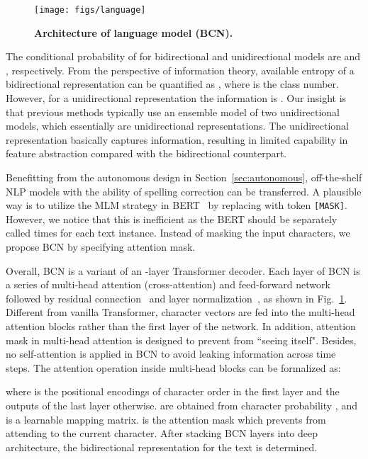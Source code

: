 \documentclass[10pt,journal,compsoc]{IEEEtran}
\begin{document}
\begin{figure}
   \begin{center}
      \texttt{[image: figs/language]}
      \caption{\textbf{Architecture of language model (BCN).}}
      \label{fig:label}
   \end{center}
   \vspace{-2em}   
\end{figure}

The conditional probability of  for bidirectional and unidirectional models are  and , respectively. From the perspective of information theory, available entropy of a bidirectional representation can be quantified as , where  is the class number. However, for a unidirectional representation the information is . Our insight is that previous methods typically use an ensemble model of two unidirectional models, which essentially are unidirectional representations. The unidirectional representation basically captures  information, resulting in limited capability in feature abstraction compared with the bidirectional counterpart.


Benefitting from the autonomous design in Section~\ref{sec:autonomous}, off-the-shelf NLP models with the ability of spelling correction can be transferred. A plausible way is to utilize the MLM strategy in BERT~\cite{devlin2018bert} by replacing  with token {\tt{[MASK]}}. However, we notice that this is inefficient as the BERT should be separately called  times for each text instance. Instead of masking the input characters, we propose BCN by specifying attention mask.


Overall, BCN is a variant of an -layer Transformer decoder. Each layer of BCN is a series of multi-head attention (cross-attention) and feed-forward network~\cite{vaswani2017attention} followed by residual connection~\cite{he2016deep} and layer normalization~\cite{ba2016layer}, as shown in Fig.~\ref{fig:label}. Different from vanilla Transformer, character vectors are fed into the multi-head attention blocks rather than the first layer of the network. In addition, attention mask in multi-head attention is designed to prevent from “seeing itself". Besides, no self-attention is applied in BCN to avoid leaking information across time steps. The attention operation inside multi-head blocks can be formalized as:

where  is the positional encodings of character order in the first layer and the outputs of the last layer otherwise.  are obtained from character probability , and  is a learnable mapping matrix.  is the attention mask which prevents from attending to the current character. After stacking BCN layers into deep architecture, the bidirectional representation  for the text  is determined.
\end{document}
